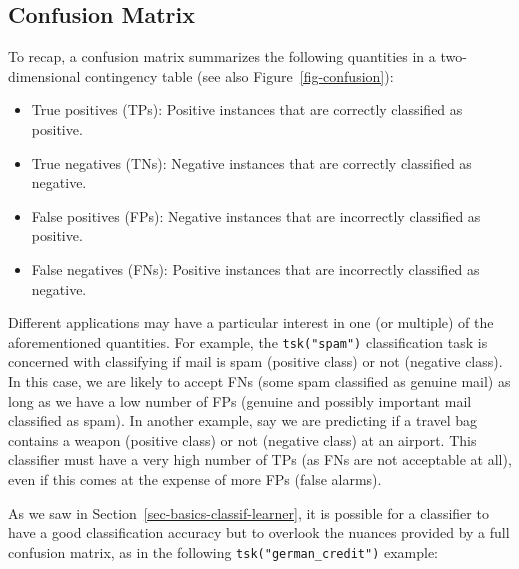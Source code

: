 \hypertarget{confusion-matrix-1}{%
\subsection{Confusion Matrix}\label{confusion-matrix-1}}

To recap, a confusion matrix summarizes the
following quantities in a two-dimensional contingency table (see also
Figure~\ref{fig-confusion}):

\begin{itemize}
\tightlist
\item
  True positives (TPs): Positive instances that
  are correctly classified as positive.
\item
  True negatives (TNs): Negative instances that
  are correctly classified as negative.
\item
  False positives (FPs): Negative instances that
  are incorrectly classified as positive.
\item
  False negatives (FNs): Positive instances that
  are incorrectly classified as negative.
\end{itemize}

Different applications may have a particular interest in one (or
multiple) of the aforementioned quantities. For example, the
\texttt{tsk("spam")} classification task is concerned with classifying
if mail is spam (positive class) or not (negative class). In this case,
we are likely to accept FNs (some spam classified as genuine mail) as
long as we have a low number of FPs (genuine and possibly important mail
classified as spam). In another example, say we are predicting if a
travel bag contains a weapon (positive class) or not (negative class) at
an airport. This classifier must have a very high number of TPs (as FNs
are not acceptable at all), even if this comes at the expense of more
FPs (false alarms).

As we saw in Section~\ref{sec-basics-classif-learner}, it is possible
for a classifier to have a good classification accuracy but to overlook
the nuances provided by a full confusion matrix, as in the following
\texttt{tsk("german\_credit")} example:


